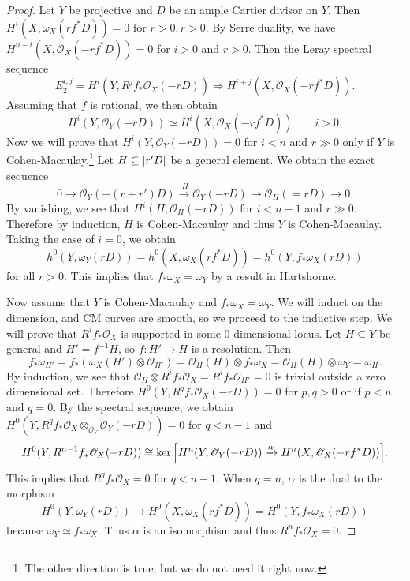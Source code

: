 \documentclass[leqno, openany]{memoir}
\theoremstyle{definition}
\theoremstyle{remark}
\theoremstyle{plain}
\theoremstyle{definition}
\theoremstyle{remark}
\newcommand{\msc}[1]{\mathscr{#1}}
\begin{document}
\begin{proof}
    Let $Y$ be projective and $D$ be an ample Cartier divisor on $Y$. Then $H^i(X, \omega_X(rf^* D)) = 0$ for $r > 0, r > 0$. By Serre duality, we have $H^{n-i}(X, \msc{O}_X(-rf^* D)) = 0$ for $i > 0$ and $r > 0$. Then the Leray spectral sequence
    \[ E_2^{i,j} = H^i(Y, R^j f_* \msc{O}_X(-rD)) \Rightarrow H^{i+j}(X, \msc{O}_X(-rf^* D)). \]
    Assuming that $f$ is rational, we then obtain
    \[ H^i(Y, \msc{O}_Y(-rD)) \simeq H^i(X, \msc{O}_X(-rf^* D)) \qquad i > 0. \]
    Now we will prove that $H^i(Y, \msc{O}_Y(-rD)) = 0$ for $i < n$ and $r \gg 0$ only if $Y$ is Cohen-Macaulay.\footnote{The other direction is true, but we do not need it right now.} Let $H \subseteq \abs{r'D}$ be a general element. We obtain the exact sequence
    \[ 0 \to \msc{O}_Y(-(r+r')D) \xrightarrow{\cdot H} \msc{O}_Y(-rD) \to \msc{O}_H(=rD) \to 0. \]
    By vanishing, we see that $H^i(H, \msc{O}_H(-rD))$ for $i < n-1$ and $r \gg 0$. Therefore by induction, $H$ is Cohen-Macaulay and thus $Y$ is Cohen-Macaulay. Taking the case of $i = 0$, we obtain
    \[ h^0(Y, \omega_Y(rD)) = h^0(X, \omega_X(rf^*D)) = h^0(Y, f_* \omega_X(rD)) \]
    for all $r > 0$. This implies that $f_* \omega_X = \omega_Y$ by a result in Hartshorne.

    Now assume that $Y$ is Cohen-Macaulay and $f_* \omega_X = \omega_Y$. We will induct on the dimension, and CM curves are smooth, so we proceed to the inductive step. We will prove that $R^i f_* \msc{O}_X$ is supported in some $0$-dimensional locus. Let $H \subseteq Y$ be general and $H' = f^{-1}H$, so $f \colon H' \to H$ is a resolution. Then 
    \[ f_* \omega_{H'} = f_* (\omega_X(H') \otimes \msc{O}_{H'}) = \msc{O}_H(H) \otimes f_* \omega_X = \msc{O}_H(H) \otimes \omega_Y = \omega_H. \]
    By induction, we see that $\msc{O}_H \otimes R^i f_* \msc{O}_X = R^i f_* \msc{O}_{H'} = 0$ is trivial outside a zero dimensional set. Therefore $H^0(Y, R^q f_* \msc{O}_X(-rD)) = 0$ for $p,q > 0$ or if $p<n$ and $q=0$. By the spectral sequence, we obtain $H^0(Y, R^q f_* \msc{O}_X \otimes_{\msc{O}_Y} \msc{O}_Y(-rD)) = 0$ for $q < n-1$ and
    \[ H^0(Y, R^{n-1}f_* \msc{O}_X(-rD)) \cong \ker \qty[ H^n(Y, \msc{O}_Y(-rD)) \xrightarrow{\alpha} H^n(X, \msc{O}_X(-rf^* D)) ]. \]
    This implies that $R^q f_* \msc{O}_X = 0$ for $q < n-1$. When $q = n$, $\alpha$ is the dual to the morphism
    \[ H^0(Y, \omega_Y(rD)) \to H^0(X, \omega_X(rf^*D)) = H^0(Y, f_* \omega_X(rD)) \]
    because $\omega_Y \simeq f_* \omega_X$. Thus $\alpha$ is an isomorphism and thus $R^n f_* \msc{O}_X = 0$.
\end{proof}
\end{document}
